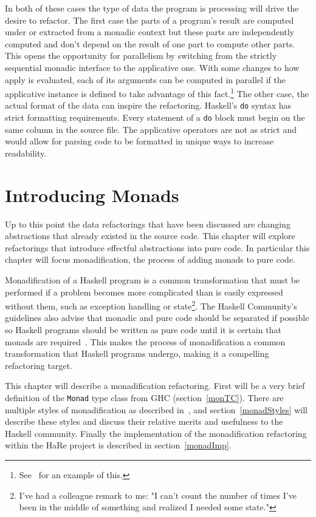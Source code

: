 In both of these cases the type of data the program is processing will drive the desire to refactor. The first case the parts of a program's result are computed under or extracted from a monadic context but these parts are independently computed and don't depend on the result of one part to compute other parts. This opens the opportunity for parallelism by switching from the strictly sequential monadic interface to the applicative one. With some changes to how apply is evaluated, each of its arguments can be computed in parallel if the applicative instance is defined to take advantage of this fact.\footnote{See~\citep{haxl} for an example of this.} The other case, the actual format of the data can inspire the refactoring. Haskell's \texttt{do} syntax has strict formatting requirements. Every statement of a \texttt{do} block must begin on the same column in the source file. The applicative operators are not as strict and would allow for parsing code to be formatted in unique ways to increase readability.
   

\chapter{Introducing Monads}
\label{chp:monadification}

Up to this point the data refactorings that have been discussed are changing abstractions that already existed in the source code. This chapter will explore refactorings that introduce effectful abstractions into pure code. In particular this chapter will focus monadification, the process of adding monads to pure code. 

Monadification of a Haskell program is a common transformation that must be performed if a problem becomes more complicated than is easily expressed without them, such as exception handling or state\footnote{I've had a colleague remark to me: "I can't count the number of times I've been in the middle of something and realized I needed some state."}. The Haskell Community's guidelines also advise that monadic and pure code should be separated if possible so Haskell programs should be written as pure code until it is certain that monads are required~\citep{guidelines}. This makes the process of monadification a common transformation that Haskell programs undergo, making it a compelling refactoring target.

This chapter will describe a monadification refactoring. First will be a very brief definition of the \texttt{Monad} type class from GHC (section~\ref{monTC}). There are multiple styles of monadification as described in~\citep{monadSurvey}, and section~\ref{monadStyles} will describe these styles and discuss their relative merits and usefulness to the Haskell community. Finally the implementation of the monadification refactoring within the HaRe project is described in section~\ref{monadImp}.
 
